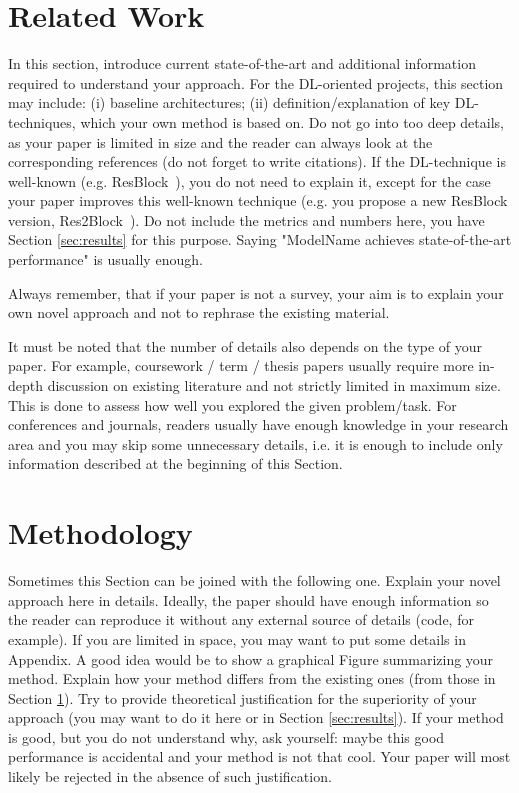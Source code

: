 \documentclass[10pt,conference,compsocconf]{IEEEtran}
\begin{document}
\section{Related Work}\label{sec:related_work}
In this section, introduce current state-of-the-art and additional information required to understand your approach. For the DL-oriented projects, this section may include: (i) baseline architectures; (ii) definition/explanation of key DL-techniques, which your own method is based on. Do not go into too deep details, as your paper is limited in size and the reader can always look at the corresponding references (do not forget to write citations). If the DL-technique is well-known (e.g. ResBlock~\cite{he2016deep}), you do not need to explain it, except for the case your paper improves this well-known technique (e.g. you propose a new ResBlock version, Res2Block~\cite{gao2019res2net}). Do not include the metrics and numbers here, you have Section \ref{sec:results} for this purpose. Saying "ModelName achieves state-of-the-art performance" is usually enough.

Always remember, that if your paper is not a survey, your aim is to explain your own novel approach and not to rephrase the existing material. 

It must be noted that the number of details also depends on the type of your paper. For example, coursework / term / thesis papers usually require more in-depth discussion on existing literature and not strictly limited in maximum size. This is done to assess how well you explored the given problem/task. For conferences and journals, readers usually have enough knowledge in your research area and you may skip some unnecessary details, i.e. it is enough to include only information described at the beginning of this Section.  

\section{Methodology}\label{sec:methodology}
Sometimes this Section can be joined with the following one. Explain your novel approach here in details. Ideally, the paper should have enough information so the reader can reproduce it without any external source of details (code, for example). If you are limited in space, you may want to put some details in Appendix. A good idea would be to show a graphical Figure summarizing your method. Explain how your method differs from the existing ones (from those in Section \ref{sec:related_work}). Try to provide theoretical justification for the superiority of your approach (you may want to do it here or in Section \ref{sec:results}). If your method is good, but you do not understand why, ask yourself: maybe this good performance is accidental and your method is not that cool. Your paper will most likely be rejected in the absence of such justification.
\end{document}
